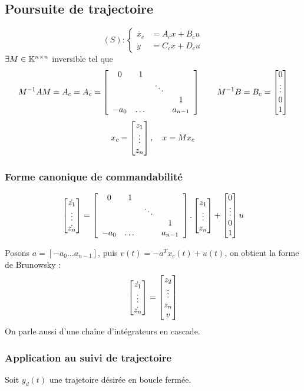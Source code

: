 \documentclass[main.tex]{subfiles}
\begin{document}
\subsection{Poursuite de trajectoire}
\[ (S) :
\left\{
\begin{array}{ll}
\dot{x_c} &= A_cx + B_cu\\
y & = C_cx+D_cu
\end{array}
\right.
\]
$\exists M \in \mathbb{K}^{n\times n}$ inversible tel que
\[M^{-1}AM = A_c = A_c = \left[ \begin{array}{cccc}
0 & 1 \\
& & \ddots \\
& & & 1 \\
-a_0 & \dots & & a_{n-1}
\end{array}\right] \qquad M^{-1}B = B_c = \begin{bmatrix} 0 \\ \vdots \\ 0 \\ 1 \end{bmatrix}\]
\[ x_c = \begin{bmatrix} z_1\\ \vdots \\ z_n \end{bmatrix}, \quad x = Mx_c\]

\subsubsection{Forme canonique de commandabilité}
\[\begin{bmatrix}  \dot{z_1} \\ \vdots \\ \dot{z_n} \end{bmatrix} = \left[ \begin{array}{cccc}
0 & 1 \\
& & \ddots \\
& & & 1 \\
-a_0 & \dots & & a_{n-1}
\end{array}\right] . \begin{bmatrix} z_1\\ \vdots \\ z_n \end{bmatrix} + \begin{bmatrix} 0 \\ \vdots \\ 0 \\ 1 \end{bmatrix}u\]

Posons $a = [-a_0 \dots a_{n-1}]$, puis $v(t) = -a^Tx_c(t)+u(t)$, on obtient la forme de Brunowsky :
\[ \begin{bmatrix}  \dot{z_1} \\ \vdots \\ \dot{z_n} \end{bmatrix} = \begin{bmatrix} z_2\\ \vdots \\ z_n \\ v \end{bmatrix} \]
On parle aussi d'une chaîne d'intégrateurs en cascade.

\subsubsection{Application au suivi de trajectoire}
Soit $y_d(t)$ une trajetoire désirée en boucle fermée.
\end{document}
